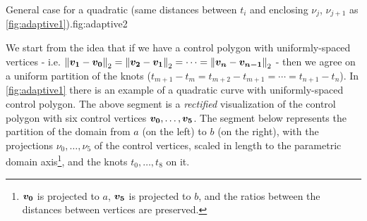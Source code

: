 \documentclass[dissertation.tex]{subfiles}
\begin{document}
\begin{myfig}{General case for a quadratic (same distances between
    $t_i$ and enclosing $\nu_j$, $\nu_{j+1}$ as \cref{fig:adaptive1}).}{fig:adaptive2}
\end{myfig}
We start from the idea that if we have a control polygon with
uniformly-spaced vertices -
i.e. $\left\lVert\boldsymbol{v_1}-\boldsymbol{v_0}\right\rVert_2=\left\lVert\boldsymbol{v_2}-\boldsymbol{v_1}\right\rVert_2=\cdots=\left\lVert\boldsymbol{v_n}-\boldsymbol{v_{n-1}}\right\rVert_2$
- then we agree on a uniform partition of the knots
($t_{m+1}-t_m=t_{m+2}-t_{m+1}=\cdots=t_{n+1}-t_n$). In
\cref{fig:adaptive1} there is an example of a quadratic \bs curve with
uniformly-spaced control polygon. The above segment is a
\emph{rectified} 
visualization of the control polygon with six control
vertices
$\boldsymbol{v_0},\dots,\boldsymbol{v_5}$. The segment below represents the
partition of the domain from $a$ (on the left) to $b$
(on the right), with the projections $\nu_0,\dots,\nu_5$ of the control
vertices,
scaled in length to the parametric domain axis\footnote{$\boldsymbol{v_0}$ is
  projected to $a$, $\boldsymbol{v_5}$ is projected to $b$, and the ratios
  between the distances between vertices are preserved.}, and the
knots $t_0,\dots,t_8$ on it.
\end{document}
